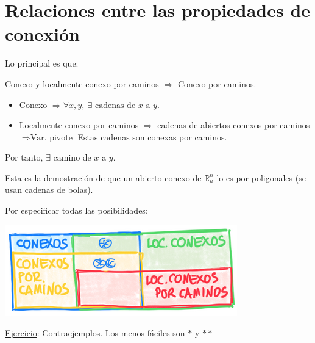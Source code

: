 \section{Relaciones entre las propiedades de conexión}%
\label{sec:relaciones_entre_las_propiedades_de_conexion}
Lo principal es que:
\begin{prop}
Conexo y localmente conexo por caminos $\Rightarrow$ Conexo por caminos.
\end{prop}
\begin{demo}
\begin{itemize}
    \item Conexo $\Rightarrow \forall x, y,\ \exists \text{ cadenas de } x \text{ a } y$.
    \item Localmente conexo por caminos $\Rightarrow$ cadenas de abiertos conexos por caminos $\Rightarrow{\text{Var. pivote}}$ Estas cadenas son conexas por caminos.
\end{itemize}
Por tanto, $\exists$ camino de $x$ a $y$.
\end{demo}
\begin{obs}
    Esta es la demostración de que un abierto conexo de $\mathbb{R}_u^n$ lo es por poligonales (se usan cadenas de bolas).
\end{obs}

\begin{obs}[Resumen]
Por especificar todas las posibilidades:
\begin{center}
    \includegraphics[scale=0.3]{images/resumen_conx} 
\end{center}
\end{obs}

\underline{Ejercicio}: Contraejemplos. Los menos fáciles son $*$ y $**$ 
